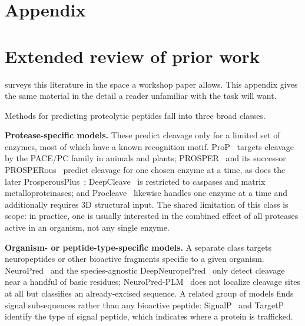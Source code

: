 \documentclass{article}
\begin{document}
\section*{Appendix}

\section{Extended review of prior work}
\label{sec:app-related}

 surveys this literature in the space a workshop paper allows. This appendix
gives the same material in the detail a reader unfamiliar with the task will want.


Methods for predicting proteolytic peptides fall into three broad classes.

\textbf{Protease-specific models.} These predict cleavage only for a limited set of enzymes, most of which have a known recognition motif. ProP~\citep{duckert2004prop} targets cleavage by the PACE/PC family in animals and plants; PROSPER~\citep{song2012prosper} and its successor PROSPERous~\citep{song2018prosperous} predict cleavage for one chosen enzyme at a time, as does the later ProsperousPlus~\citep{li2023prosperousplus}; DeepCleave~\citep{li2020deepcleave} is restricted to caspases and matrix metalloproteinases; and Procleave~\citep{li2020procleave} likewise handles one enzyme at a time and additionally requires 3D structural input. The shared limitation of this class is scope: in practice, one is usually interested in the combined effect of all proteases active in an organism, not any single enzyme.

\textbf{Organism- or peptide-type-specific models.} A separate class targets neuropeptides or other bioactive fragments specific to a given organism. NeuroPred~\citep{southey2006neuropred} and the species-agnostic DeepNeuropePred~\citep{wang2024deepneuropepred} only detect cleavage near a handful of basic residues; NeuroPred-PLM~\citep{wang2023neuropredplm} does not localize cleavage sites at all but classifies an already-excised sequence. A related group of models finds signal subsequences rather than any bioactive peptide: SignalP~\citep{teufel2022signalp6} and TargetP~\citep{almagro2019targetp} identify the type of signal peptide, which indicates where a protein is trafficked.
\end{document}
